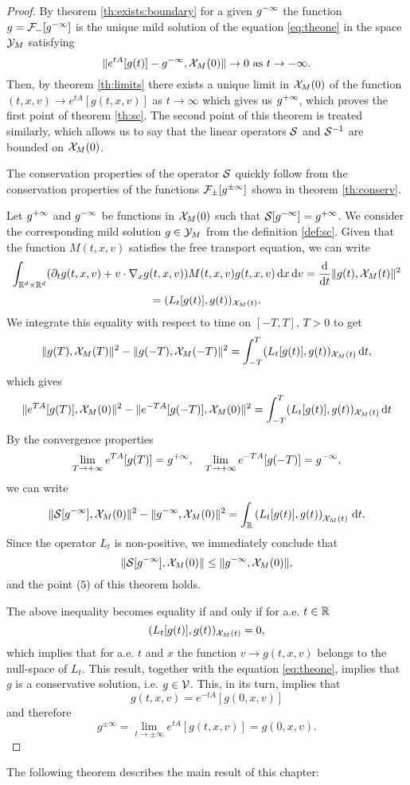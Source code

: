 \begin{proof}
	By   theorem \ref{th:exists:boundary} for a given ${g^{-\infty}}$ the function $g=\mathcal F_-[{g^{-\infty}}]$ is the unique mild solution of the equation \eqref{eq:theone} in the space ${\mathcal Y_M}$ satisfying \[\|e^{tA}[g(t)]-{g^{-\infty}},{\mathcal X_M(0)}\|\to 0\mbox{ as }t\to -\infty.\]
	Then, by   theorem \ref{th:limits} there exists a unique limit in ${\mathcal X_M(0)}$ of the function $(t,x,v)\to e^{tA}[g(t,x,v)]$ as $t\to\infty$ which gives us ${g^{+\infty}}$, which proves the first point of   theorem \ref{th:sc}. The second point of this theorem is treated similarly, which allows us to say that the linear operators $\mathcal S$ and $\mathcal S^{-1}$ are bounded on ${\mathcal X_M(0)}$.

	The conservation properties of the operator $\mathcal S$ quickly follow from the conservation properties of the functions $\mathcal F_\pm[ g^{\pm\infty} ]$ shown in theorem \ref{th:conserv}.

	Let ${g^{+\infty}}$ and ${g^{-\infty}}$ be functions in ${\mathcal X_M(0)}$ such that $\mathcal S[{g^{-\infty}}]={g^{+\infty}}$. We consider the corresponding mild solution $g\in{\mathcal Y_M}$ from the definition \ref{def:sc}. Given that the function $M(t,x,v)$ satisfies the free transport equation, we can write 
	\[\int_{{\mathbb R^d}\times{\mathbb R^d}}(\partial_t g(t,x,v)+v\cdot\nabla_x g(t,x,v))M(t,x,v)g(t,x,v){\,\mathrm{d} x}{\,\mathrm{d} v} = \frac{\mathrm d}{\mathrm dt  } \|g(t),{\mathcal X_M(t)}\|^2\]
	\[=(L_t[g(t)],g(t))_{{\mathcal X_M(t)}}.\]
	We integrate this equality with respect to time 
	on $[-T,T]$, $T>0$ to get
	\[ \|g(T),{\mathcal X_M(T)}\|^2 -\|g(-T),{\mathcal X_M(-T)}\|^2=\int_{-T}^{T}(L_t[g(t)],g(t))_{{\mathcal X_M(t)}}{\,\mathrm dt},\]
	which gives
	\[ \|e^{TA}[g(T)],{\mathcal X_M(0)}\|^2-\|e^{-TA}[g(-T)],{\mathcal X_M(0)}\|^2=\int_{-T}^{T}(L_t[g(t)],g(t))_{{\mathcal X_M(t)}}{\,\mathrm dt}\]
	By the convergence properties \[\lim_{T\to+\infty}e^{TA}[g(T)] = {g^{+\infty}}, \quad \lim_{T\to+\infty}e^{-TA}[g(-T)] = {g^{-\infty}},\]  we can write
	\[ \|\mathcal S[{g^{-\infty}}],{\mathcal X_M(0)}\|^2 -\|{g^{-\infty}},{\mathcal X_M(0)}\|^2=\int_{{\mathbb R}}\left(L_t[g(t)],g(t)\right)_{{\mathcal X_M(t)}}{\,\mathrm dt}.\]
	Since the operator $L_t$ is non-positive, we immediately conclude that
	\[\|\mathcal S[{g^{-\infty}}],{\mathcal X_M(0)}\|  \le  \|{g^{-\infty}},{\mathcal X_M(0)}\|,\]
	and the point ($5$) of this theorem holds.

	The above inequality becomes equality if and only if for a.e. $t\in{\mathbb R}$ \[ (L_t[g(t)],g(t))_{{\mathcal X_M(t)}}=0,\] which implies that for a.e. $t$ and $x$ the function $v\to g(t,x,v)$ belongs to the null-space of $L_t$. This result, together with the equation \eqref{eq:theone}, implies that $g$ is a conservative solution, i.e. $g\in {\mathcal V}$. This, in its turn, implies that \[
	g(t,x,v)=e^{-tA}[g(0,x,v)]\]
	and therefore
	\[g^{\pm \infty	} = \lim_{t\to\pm \infty}e^{tA}[g(t,x,v)] = g(0,x,v).\]
\end{proof}
The following theorem describes the main result of this chapter:
